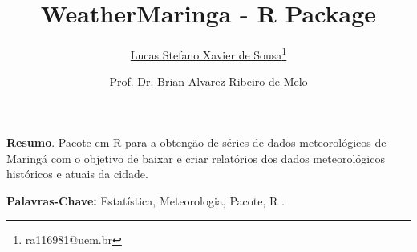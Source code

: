 \documentclass{ceel}
\title{WeatherMaringa - R Package}
\author[1]{\underline{Lucas Stefano Xavier de Sousa}\thanks{ ra116981@uem.br }}
\author[1]{Prof. Dr. Brian Alvarez Ribeiro de Melo}
\affil[1]{DES - Universidade Estadual de Maringá}
\begin{document}
	
\inserirtitulo
			
		
		\textbf{Resumo}. Pacote em R para a obtenção de séries de dados meteorológicos de Maringá com o objetivo de baixar e criar relatórios dos dados meteorológicos históricos e atuais da cidade.
		
		\bigskip
		\textbf{Palavras-Chave:} Estatística, Meteorologia, Pacote, R .
				
\end{document}
